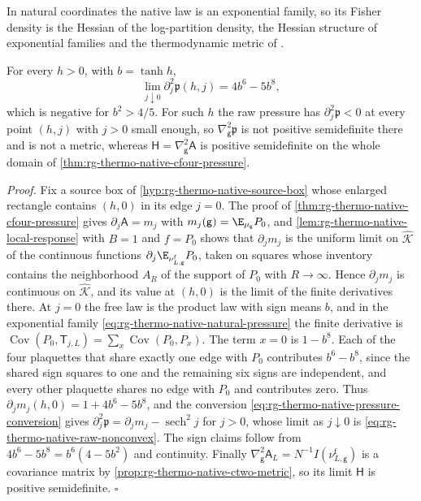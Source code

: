 In natural coordinates the native law is an exponential family, so its
Fisher density is the Hessian of the log-partition density, the Hessian
structure of exponential families \citep[Ch.~3]{AmariNagaoka2000} and the
thermodynamic metric of \citet{Crooks2007}.

For every $h>0$, with $b=\tanh h$,
\begin{equation}
 \lim_{j\downarrow0}\partial_j^2\mathfrak p(h,j)=4b^6-5b^8,
 \label{eq:rg-thermo-native-raw-nonconvex}
\end{equation}
which is negative for $b^2>4/5$. For such $h$ the raw pressure has
$\partial_j^2\mathfrak p<0$ at every point $(h,j)$ with $j>0$ small enough,
so $\nabla_{\mathsf g}^2\mathfrak p$ is not positive semidefinite there and is
not a metric, whereas $\mathsf H=\nabla_{\mathsf g}^2\mathsf A$ is positive
semidefinite on the whole domain of
\cref{thm:rg-thermo-native-cfour-pressure}. 

\noindent\emph{Proof.}
Fix a source box of \cref{hyp:rg-thermo-native-source-box} whose enlarged
rectangle contains $(h,0)$ in its edge $j=0$. The proof of
\cref{thm:rg-thermo-native-cfour-pressure} gives $\partial_j\mathsf A=m_j$
with $m_j(\mathsf g)=\E_{\mu_{\mathsf g}}P_0$, and
\cref{lem:rg-thermo-native-local-response} with $B=1$ and $f=P_0$ shows that
$\partial_jm_j$ is the uniform limit on $\widehat{\mathcal K}$ of the
continuous functions $\partial_j\E_{\nu^{\mathrm f}_{L,\mathsf g}}P_0$, taken
on squares whose inventory contains the neighborhood $A_R$ of the support of
$P_0$ with $R\to\infty$. Hence $\partial_jm_j$ is continuous on
$\widehat{\mathcal K}$, and its value at $(h,0)$ is the limit of the finite
derivatives there. At $j=0$ the free law is the product law with sign means
$b$, and in the exponential family \cref{eq:rg-thermo-native-natural-pressure}
the finite derivative is
$\operatorname{Cov}(P_0,\mathsf T_{j,L})=\sum_x\operatorname{Cov}(P_0,P_x)$.
The term $x=0$ is $1-b^8$. Each of the four plaquettes that share exactly one
edge with $P_0$ contributes $b^6-b^8$, since the shared sign squares to one and
the remaining six signs are independent, and every other plaquette shares no
edge with $P_0$ and contributes zero. Thus
$\partial_jm_j(h,0)=1+4b^6-5b^8$, and the conversion
\cref{eq:rg-thermo-native-pressure-conversion} gives
$\partial_j^2\mathfrak p=\partial_jm_j-\operatorname{sech}^2j$ for $j>0$,
whose limit as $j\downarrow0$ is \cref{eq:rg-thermo-native-raw-nonconvex}.
The sign claims follow from $4b^6-5b^8=b^6(4-5b^2)$ and continuity. Finally
$\nabla_{\mathsf g}^2\mathsf A_L=N^{-1}I(\nu^{\mathrm f}_{L,\mathsf g})$ is a
covariance matrix by \cref{prop:rg-thermo-native-ctwo-metric}, so its limit
$\mathsf H$ is positive semidefinite. $\square$

